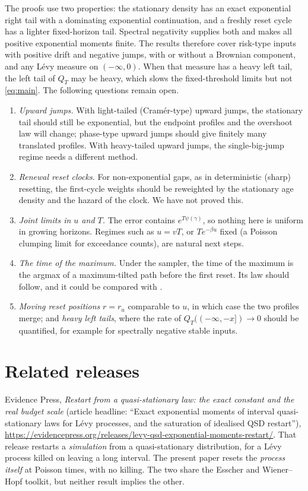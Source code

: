 \documentclass[11pt,a4paper]{article}
\begin{document}
The proofs use two properties: the stationary density has an exact exponential right tail with a dominating exponential continuation, and a freshly reset cycle has a lighter fixed-horizon tail. Spectral negativity supplies both and makes all positive exponential moments finite. The results therefore cover risk-type inputs with positive drift and negative jumps, with or without a Brownian component, and any L\'evy measure on $(-\infty,0)$. When that measure has a heavy left tail, the left tail of $Q_T$ may be heavy, which slows the fixed-threshold limits but not \eqref{eq:main}. The following questions remain open.
\begin{enumerate}
\item \emph{Upward jumps.} With light-tailed (Cram\'er-type) upward jumps, the stationary tail should still be exponential, but the endpoint profiles and the overshoot law will change; phase-type upward jumps should give finitely many translated profiles. With heavy-tailed upward jumps, the single-big-jump regime needs a different method.
\item \emph{Renewal reset clocks.} For non-exponential gaps, as in deterministic (sharp) resetting, the first-cycle weights should be reweighted by the stationary age density and the hazard of the clock. We have not proved this.
\item \emph{Joint limits in $u$ and $T$.} The error contains $e^{T\psi(\gamma)}$, so nothing here is uniform in growing horizons. Regimes such as $u=vT$, or $Te^{-\beta u}$ fixed (a Poisson clumping limit for exceedance counts), are natural next steps.
\item \emph{The time of the maximum.} Under the sampler, the time of the maximum is the argmax of a maximum-tilted path before the first reset. Its law should follow, and it could be compared with \cite{MMS2021}.
\item \emph{Moving reset positions} $r=r_u$ comparable to $u$, in which case the two profiles merge; and \emph{heavy left tails}, where the rate of $Q_T((-\infty,-x])\to0$ should be quantified, for example for spectrally negative stable inputs.
\end{enumerate}

\section*{Related releases}
Evidence Press, \emph{Restart from a quasi-stationary law: the exact constant and the real budget scale} (article headline: ``Exact exponential moments of interval quasi-stationary laws for L\'evy processes, and the saturation of idealised QSD restart''),
\url{https://evidencepress.org/releases/levy-qsd-exponential-moments-restart/}. That release restarts a \emph{simulation} from a quasi-stationary distribution, for a L\'evy process killed on leaving a long interval. The present paper resets the \emph{process itself} at Poisson times, with no killing. The two share the Esscher and Wiener--Hopf toolkit, but neither result implies the other.
\end{document}
